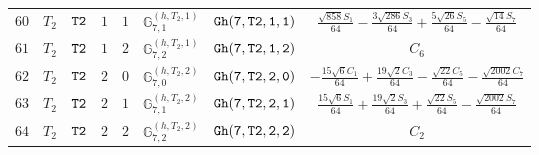 \documentclass[fleqn,8pt]{jsarticle}
\begin{document}
\begin{table}[ht!]
\begin{center}
\begin{tabular}{cccccccc}
$ 60 $ & $ T_{2} $ & $ {\tt T2} $ & $ 1 $ & $ 1 $ & $ \mathbb{G}_{7,1}^{(h,T_{2},1)} $ & $ {\tt Gh(7,T2,1,1)} $ & $ \frac{\sqrt{858} S_{1}}{64} - \frac{3 \sqrt{286} S_{3}}{64} + \frac{5 \sqrt{26} S_{5}}{64} - \frac{\sqrt{14} S_{7}}{64} $ \\
$ 61 $ & $ T_{2} $ & $ {\tt T2} $ & $ 1 $ & $ 2 $ & $ \mathbb{G}_{7,2}^{(h,T_{2},1)} $ & $ {\tt Gh(7,T2,1,2)} $ & $ C_{6} $ \\
$ 62 $ & $ T_{2} $ & $ {\tt T2} $ & $ 2 $ & $ 0 $ & $ \mathbb{G}_{7,0}^{(h,T_{2},2)} $ & $ {\tt Gh(7,T2,2,0)} $ & $ - \frac{15 \sqrt{6} C_{1}}{64} + \frac{19 \sqrt{2} C_{3}}{64} - \frac{\sqrt{22} C_{5}}{64} - \frac{\sqrt{2002} C_{7}}{64} $ \\
$ 63 $ & $ T_{2} $ & $ {\tt T2} $ & $ 2 $ & $ 1 $ & $ \mathbb{G}_{7,1}^{(h,T_{2},2)} $ & $ {\tt Gh(7,T2,2,1)} $ & $ \frac{15 \sqrt{6} S_{1}}{64} + \frac{19 \sqrt{2} S_{3}}{64} + \frac{\sqrt{22} S_{5}}{64} - \frac{\sqrt{2002} S_{7}}{64} $ \\
$ 64 $ & $ T_{2} $ & $ {\tt T2} $ & $ 2 $ & $ 2 $ & $ \mathbb{G}_{7,2}^{(h,T_{2},2)} $ & $ {\tt Gh(7,T2,2,2)} $ & $ C_{2} $ \\
 \hline \hline
\end{tabular}
\end{center}
\end{table}
\end{document}
